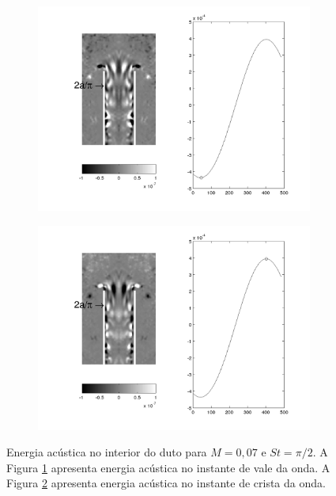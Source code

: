 \newpage
\vfill
\begin{figure}[ht!]
\begin{subfigure}{0.9 \textwidth}
  \includegraphics[width=1.\linewidth]{figuras/max_007_1.png}
  \caption[]{}
  \label{fig:max_007_1}
\end{subfigure}\par\medskip
\begin{subfigure}{0.9 \textwidth}
  \includegraphics[width=1.\linewidth]{figuras/max_007_3.png}
  \caption[]{}
  \label{fig:max_007_3}
\end{subfigure}\par\medskip
\caption[Energia acústica para $M = 0,07$ e $St = \pi/2$.]{Energia acústica no interior do duto para $M = 0,07$ e $St = \pi/2$. A Figura \ref{fig:max_007_1} apresenta energia acústica no instante de vale da onda. A Figura \ref{fig:max_007_3} apresenta energia acústica no instante de crista da onda.}\label{fig:max_007}
\end{figure}
\vfill
\clearpage

